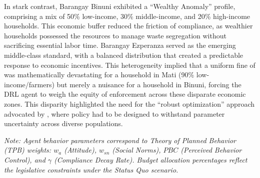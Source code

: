In stark contrast, Barangay Binuni exhibited a ``Wealthy Anomaly'' profile, comprising a mix of 50\% low-income, 30\% middle-income, and 20\% high-income households. This economic buffer reduced the friction of compliance, as wealthier households possessed the resources to manage waste segregation without sacrificing essential labor time. Barangay Ezperanza served as the emerging middle-class standard, with a balanced distribution that created a predictable response to economic incentives. This heterogeneity implied that a uniform fine of  was mathematically devastating for a household in Mati (90\% low-income/farmers) but merely a nuisance for a household in Binuni, forcing the DRL agent to weigh the equity of enforcement across these disparate economic zones. This disparity highlighted the need for the ``robust optimization'' approach advocated by \cite{Gentile2022}, where policy had to be designed to withstand parameter uncertainty across diverse populations.

\begin{table}[htbp]
    \centering
    \caption{Calibrated Behavioral Weights and Legislative Allocation Strategies}
    \label{tab:behavioral_parameters}
    \vspace{1ex}
    
    \raggedright
    \footnotesize
    \textit{Note: Agent behavior parameters correspond to Theory of Planned Behavior (TPB) weights: $w_a$ (Attitude), $w_{sn}$ (Social Norms), $PBC$ (Perceived Behavior Control), and $\gamma$ (Compliance Decay Rate). Budget allocation percentages reflect the legislative constraints under the Status Quo scenario.}
\end{table}

